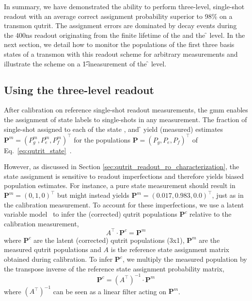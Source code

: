 In summary, we have demonstrated the ability to perform three-level, single-shot readout with an average correct assignment probability superior to 98\% on a transmon qutrit. The assignment errors are dominated by decay events during the 400\unit{ns} readout  originating from the finite lifetime of the \e{} and the \f{} level. In the next section, we detail how to monitor the populations of the first three basis states of a transmon with this readout scheme for arbitrary measurements and illustrate the scheme on a \t{1}-measurement of the \f{} level.

\subsection{Using the three-level readout} \label{sec:qutrit_readout_correction}
After calibration on reference single-shot readout measurements, the \gls{gmm} enables the assignment of state labels to single-shots in any measurement. The fraction of single-shot assigned to each of the state \g, \e{} and \f{} yield (measured) estimates $\bm{P}^m = (P_g^m, P_e^m, P_f^m)^\intercal$ for the populations $\bm{P} = (P_g, P_e, P_f)^\intercal$ of Eq.~\eqref{eq:qutrit_state}~\cite{Magnard2018FastQubit}.

However, as discussed in Section \ref{sec:qutrit_readout_ro_characterization}, the state assignment is sensitive to readout imperfections and therefore yields biased population estimates. For instance, a pure \e{} state measurement should result in $\bm{P}^m = (0,1,0)^\intercal$ but might instead yields $\bm{P}^m = (0.017,0.983,0.0)^\intercal$, just as in the calibration measurement. To account for these imperfections, we use a latent variable model~\cite{Cai2012LatentModeling} to infer the (corrected) qutrit populations $\bm{P}^c$ relative to the calibration measurement,
\begin{equation}
    A^\intercal \cdot \bm{P}^c = \bm{P}^m
\end{equation}
where $\bm{P}^c$ are the latent (corrected) qutrit populations (3x1), $\bm{P}^m$ are the measured qutrit populations and $A$ is the reference state assignment matrix obtained during calibration. To infer $\bm{P}^c$, we multiply the measured population by the transpose inverse of the reference state assignment probability matrix,
\begin{equation} \label{eq:mtx_inversion}
     \bm{P}^c = (A^{\intercal})^{-1} \cdot\bm{P}^m
\end{equation}
where $(A^{\intercal})^{-1}$ can be seen as a linear filter acting on $\bm{P}^m$. 

